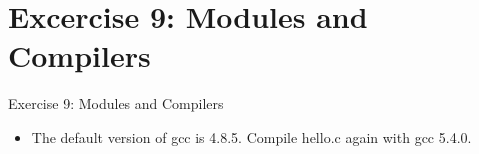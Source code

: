 \section{Excercise 9: Modules and Compilers}
\begin{frame}[fragile]{Exercise 9: Modules and Compilers}
\begin{itemize} 
\item{The default version of gcc is 4.8.5. Compile hello.c again with \alert{gcc 5.4.0}.}
\end{itemize}
\end{frame}

